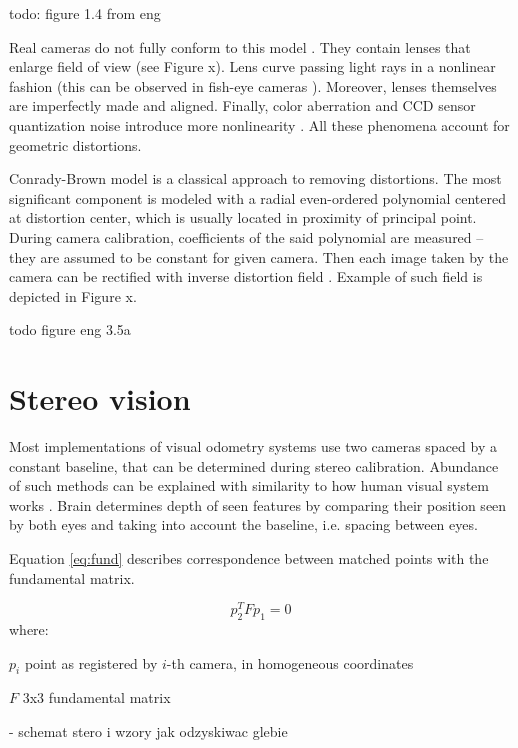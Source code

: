 todo: figure 1.4 from eng

Real cameras do not fully conform to this model \cite{szczesny}. They contain lenses that enlarge field of view (see Figure x). Lens curve passing light rays in a nonlinear fashion (this can be observed in fish-eye cameras \cite{eng23}). Moreover, lenses themselves are imperfectly made and aligned. Finally, color aberration and CCD sensor quantization noise introduce more nonlinearity \cite{heikkla14}. All these phenomena account for geometric distortions.

Conrady-Brown model \cite{brown8} is a classical approach to removing distortions. The most significant component is modeled with a radial even-ordered polynomial centered at distortion center, which is usually located in proximity of principal point. During camera calibration, coefficients of the said polynomial are measured -- they are assumed to be constant for given camera. Then each image taken by the camera can be rectified with inverse distortion field \cite{opencv}. Example of such field is depicted in Figure x.

todo figure eng 3.5a


\section{Stereo vision}
\label{sec:stereo}

Most implementations of visual odometry systems use two cameras spaced by a constant baseline, that can be determined during stereo calibration. Abundance of such methods can be explained with similarity to how human visual system works \cite{cyganek}. Brain determines depth of seen features by comparing their position seen by both eyes and taking into account the baseline, i.e. spacing between eyes.

Equation \ref{eq:fund} describes correspondence between matched points with the fundamental matrix. 

\begin{equation}
p_{2}^{T}Fp_{1}=0
\label{eq:homo}
\end{equation}
where:
\begin{eqwhere}[2cm]
	\item[$p_{i}$] point as registered by $i$-th camera, in homogeneous coordinates
	\item[$F$] 3x3 fundamental matrix
\end{eqwhere}

\cite{improving} - schemat stero i wzory jak odzyskiwac glebie

